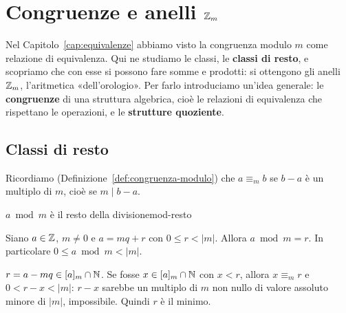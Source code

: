 \chapter{Congruenze e anelli $\mathbb{Z}_m$}\label{cap:congruenze}

Nel Capitolo~\ref{cap:equivalenze} abbiamo visto la congruenza modulo $m$ come relazione di equivalenza. Qui ne studiamo le classi,
le \textbf{classi di resto}, e scopriamo che con esse si possono fare somme e prodotti: si ottengono gli anelli $\mathbb{Z}_m$, l'aritmetica
«dell'orologio». Per farlo introduciamo un'idea generale: le \textbf{congruenze} di una struttura algebrica, cioè le relazioni di
equivalenza che rispettano le operazioni, e le \textbf{strutture quoziente}.

\section{Classi di resto}\label{sec:classi-resto}

Ricordiamo (Definizione~\ref{def:congruenza-modulo}) che $a \equiv_m b$ se $b - a$ è un multiplo di $m$, cioè se $m \mid b - a$.



\begin{concetto}
\begin{Proposizione}{$a \bmod m$ è il resto della divisione}{mod-resto}
    \begin{prerequisiti}
    \end{prerequisiti}
    Siano $a \in \mathbb{Z}$, $m \neq 0$ e $a = mq + r$ con $0 \leq r < |m|$. Allora $a \bmod m = r$. In particolare $0 \leq a \bmod m < |m|$.
\end{Proposizione}
\begin{dimostrazione}
    $r = a - mq \in [a]_m \cap \mathbb{N}$. Se fosse $x \in [a]_m \cap \mathbb{N}$ con $x < r$, allora $x \equiv_m r$ e $0 < r - x < |m|$: $r - x$ sarebbe un multiplo di $m$
    non nullo di valore assoluto minore di $|m|$, impossibile. Quindi $r$ è il minimo.
\end{dimostrazione}
\end{concetto}

